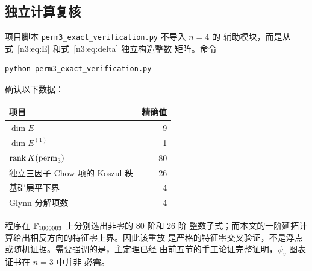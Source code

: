 \subsection{独立计算复核}

项目脚本 \texttt{perm3\_exact\_verification.py} 不导入 \(n=4\) 的
辅助模块，而是从式~\eqref{n3:eq:E} 和式~\eqref{n3:eq:delta} 独立构造整数
矩阵。命令
\begin{verbatim}
python perm3_exact_verification.py
\end{verbatim}
确认以下数据：
\begin{center}
\begin{tabular}{@{}lr@{}}
\toprule
项目 & 精确值\\
\midrule
\(\dim E\) & 9\\
\(\dim E^{(1)}\) & 1\\
\(\operatorname{rank} K(\operatorname{perm}_3)\) & 80\\
独立三因子 Chow 项的 Koszul 秩 & 26\\
基础展平下界 & 4\\
Glynn 分解项数 & 4\\
\bottomrule
\end{tabular}
\end{center}
程序在 \(\mathbb F_{1000003}\) 上分别选出非零的 \(80\) 阶和 \(26\) 阶
整数子式；而本文的一阶延拓计算给出相反方向的特征零上界。因此该重放
是严格的特征零交叉验证，不是浮点或随机证据。需要强调的是，主定理已经
由前五节的手工论证完整证明，\(\psi_v\) 图表证书在 \(n=3\) 中并非
必需。
